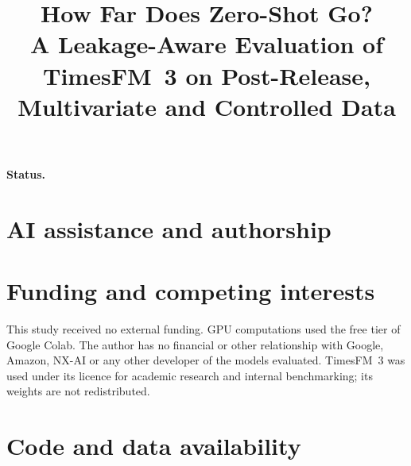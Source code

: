\documentclass[11pt]{article}
\title{How Far Does Zero-Shot Go?\\
\large A Leakage-Aware Evaluation of TimesFM~3 on Post-Release, Multivariate and Controlled Data}
\author{\PaperAuthors}
\date{\PaperVersionLine}
\begin{document}
\maketitle

\begin{abstract}

\end{abstract}

\noindent\textbf{Status.} \PaperStatus










\FloatBarrier




\section*{AI assistance and authorship}


\section*{Funding and competing interests}
This study received no external funding. GPU computations used the free tier of Google Colab. The author has no financial or
other relationship with Google, Amazon, NX-AI or any other developer of the models evaluated. TimesFM~3 was used under its
licence for academic research and internal benchmarking; its weights are not redistributed.

\section*{Code and data availability}





\appendix

\end{document}
